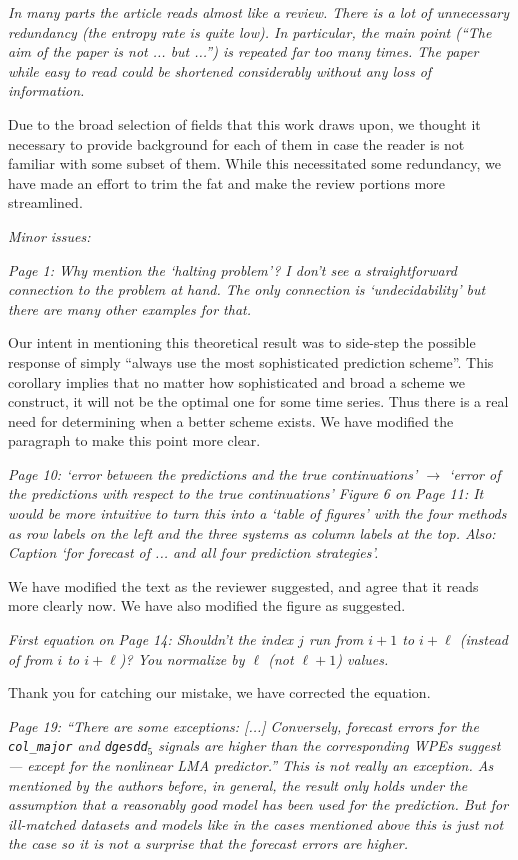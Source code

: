 \documentclass[12pt]{article}
\newcommand{\alert}[1]{{\color{red}#1}}
\begin{document}
\emph{In many parts the article reads almost like a review. There is a lot of
unnecessary redundancy (the entropy rate is quite low). In particular, the main
point (``The aim of the paper is not ... but ...'') is repeated far too many
times. The paper while easy to read could be shortened considerably without any
loss of information.}

Due to the broad selection of fields that this work draws upon, we thought it
necessary to provide background for each of them in case the reader is not
familiar with some subset of them. While this necessitated some redundancy,
\alert{we have made an effort to trim the fat and make the review portions more
streamlined.}

\noindent\emph{Minor issues:}

\emph{Page 1: Why mention the `halting problem'? I don't see a straightforward
connection to the problem at hand. The only connection is `undecidability' but
there are many other examples for that.}

Our intent in mentioning this theoretical result was to side-step the possible
response of simply ``always use the most sophisticated prediction scheme''. This
corollary implies that no matter how sophisticated and broad a scheme we
construct, it will not be the optimal one for some time series. Thus there is a
real need for determining when a better scheme exists. \alert{We have modified
the paragraph to make this point more clear.}

\emph{Page 10: `error between the predictions and the true continuations'
$\rightarrow$ `error of the predictions with respect to the true continuations'
Figure 6 on Page 11: It would be more intuitive to turn this into a `table of
figures' with the four methods as row labels on the left and the three systems
as column labels at the top. Also: Caption `for forecast of ... and all four
prediction strategies'.}

We have modified the text as the reviewer suggested, and agree that it reads
more clearly now. We have also modified the figure as suggested.

\emph{First equation on Page 14: Shouldn't the index $j$ run from $i+1$ to
$i+\ell$ (instead of from $i$ to $i+\ell$)? You normalize by $\ell$ (not
$\ell+1$) values.}

Thank you for catching our mistake, we have corrected the equation.

\emph{Page 19: ``There are some exceptions: [...] Conversely, forecast errors
for the \texttt{col\_major} and \texttt{dgesdd$_5$} signals are higher than the
corresponding WPEs suggest --- except for the nonlinear LMA predictor.'' This is
not really an exception. As mentioned by the authors before, in general, the
result only holds under the assumption that a reasonably good model has been
used for the prediction. But for ill-matched datasets and models like in the
cases mentioned above this is just not the case so it is not a surprise that the
forecast errors are higher.}
\end{document}
